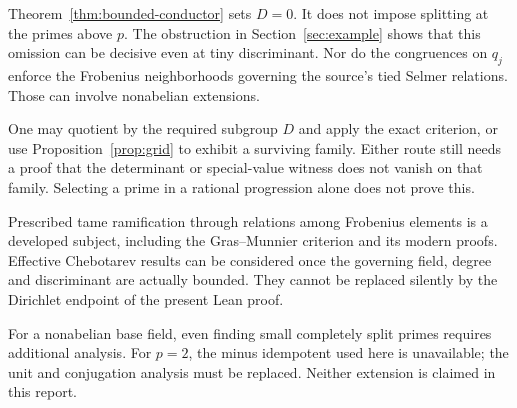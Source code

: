 Theorem~\ref{thm:bounded-conductor} sets $D=0$. It does not impose splitting at the primes above $p$. The obstruction in Section~\ref{sec:example} shows that this omission can be decisive even at tiny discriminant. Nor do the congruences on $q_j$ enforce the Frobenius neighborhoods governing the source's tied Selmer relations. Those can involve nonabelian extensions.

One may quotient by the required subgroup $D$ and apply the exact criterion, or use Proposition~\ref{prop:grid} to exhibit a surviving family. Either route still needs a proof that the determinant or special-value witness does not vanish on that family. Selecting a prime in a rational progression alone does not prove this.

Prescribed tame ramification through relations among Frobenius elements is a developed subject, including the Gras--Munnier criterion and its modern proofs.\cite{hmr} Effective Chebotarev results can be considered once the governing field, degree and discriminant are actually bounded.\cite{thorner} They cannot be replaced silently by the Dirichlet endpoint of the present Lean proof.

For a nonabelian base field, even finding small completely split primes requires additional analysis. For $p=2$, the minus idempotent used here is unavailable; the unit and conjugation analysis must be replaced. Neither extension is claimed in this report.
